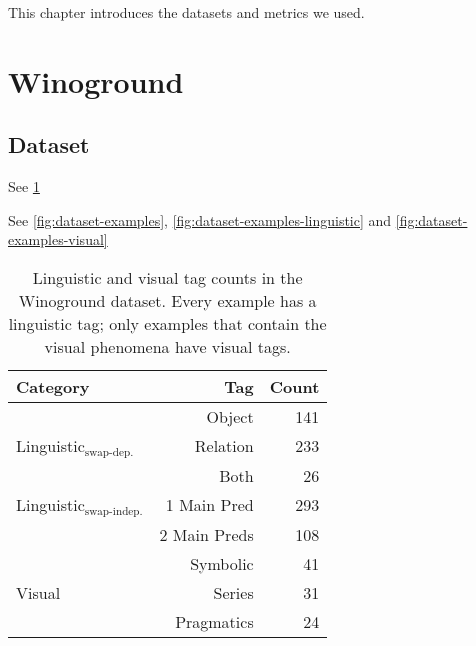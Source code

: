 This chapter introduces the datasets and metrics we used.

\section{Winoground}

\subsection{Dataset}

See \cref{tab:stats-tag-subset}

See \cref{fig:dataset-examples}, \cref{fig:dataset-examples-linguistic} and \cref{fig:dataset-examples-visual}

\begin{table}
\centering
\begin{tabular}{lrr}
\toprule
 Category & Tag    &   Count \\
\midrule
 & Object   &     141 \\
 Linguistic$_\text{swap-dep.}$ & Relation &     233 \\
 & Both &      26 \\\midrule
 Linguistic$_\text{swap-indep.}$ & 1 Main Pred & 293 \\
 & 2 Main Preds & 108 \\\midrule
 & Symbolic &  41 \\
 Visual & Series &  31 \\
 & Pragmatics &  24\\
\bottomrule
\end{tabular}
\caption{Linguistic and visual tag counts in the Winoground dataset. Every example has a linguistic tag; only examples that contain the visual phenomena have visual tags.}
\label{tab:stats-tag-subset}
\end{table}

